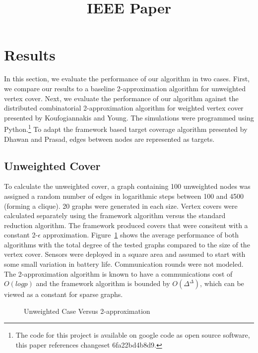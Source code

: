 \documentclass[conference, 11pt]{IEEEtran}
\theoremstyle{definition}
\begin{document}
\title{IEEE Paper} 

\author{
}

\maketitle

\begin{abstract}

\end{abstract}

\section{Results} 
In this section, we evaluate the performance of our algorithm in two cases. First, we compare our results to a baseline 2-approximation algorithm for unweighted vertex cover.\cite{500824} Next, we evaluate the performance of our algorithm against the distributed combinatorial 2-approximation algorithm for weighted vertex cover presented by Koufogiannakis and Young.\cite{1582746} The simulations were programmed using Python.\footnote{The code for this project is available on google code as open source software, this paper references changeset 6fa22bd4b8d9.} To adapt the framework based target coverage algorithm presented by Dhawan and Prasad\cite{IPDPS.2008.45361}, edges between nodes are represented as targets. 
\subsection{Unweighted Cover}
To calculate the unweighted cover, a graph containing 100 unweighted nodes was assigned a random number of edges in logarithmic steps between 100 and 4500 (forming a clique). 20 graphs were generated in each size. Vertex covers were calculated separately using the framework algorithm versus the standard reduction algorithm. The framework produced covers that were consitent with a constant 2-$\epsilon$ approximation. Figure~\ref{fig:unweight_covers} shows the average performance of both algorithms with the total degree of the tested graphs compared to the size of the vertex cover. Sensors were deployed in a square area and assumed to start with some small variation in battery life. Communication rounds were not modeled. The 2-approximation algorithm is known to have a communications cost of $O(log p)$ and the framework algorithm is bounded by $O(\Delta^\Delta)$, which can be viewed as a constant for sparse graphs.

\begin{figure}[width=2in]
  \label{fig:unweight_covers}
  \caption{Unweighted Case Versus 2-approximation}
  
\end{figure}	


\end{document}
